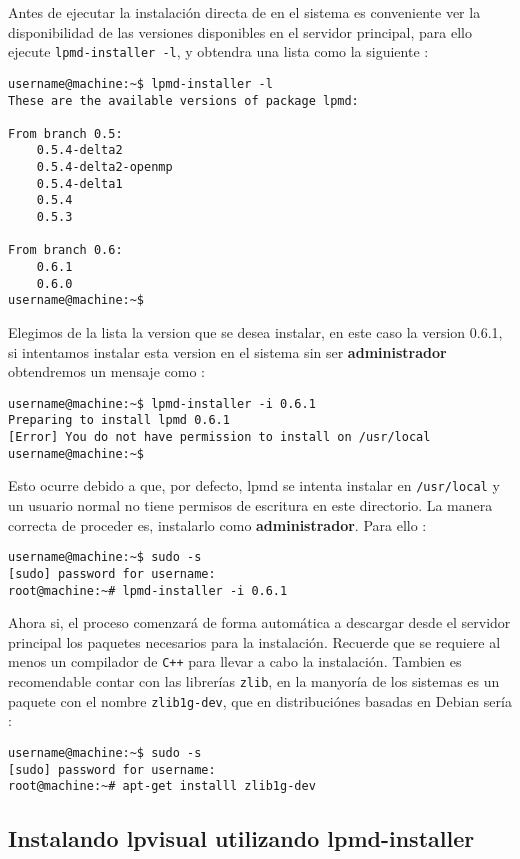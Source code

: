 Antes de ejecutar la instalaci\'on directa de {\lpmd} en el sistema es conveniente ver la disponibilidad de las versiones disponibles en el servidor principal, para ello ejecute \verb|lpmd-installer -l|, y obtendra una lista como la siguiente :

\begin{verbatim}
username@machine:~$ lpmd-installer -l
These are the available versions of package lpmd:

From branch 0.5: 
    0.5.4-delta2
    0.5.4-delta2-openmp
    0.5.4-delta1
    0.5.4
    0.5.3

From branch 0.6: 
    0.6.1
    0.6.0
username@machine:~$
\end{verbatim}

Elegimos de la lista la version que se desea instalar, en este caso la version 0.6.1, si intentamos instalar esta version en el sistema sin ser \textbf{administrador} obtendremos un mensaje como  :

\begin{verbatim}
username@machine:~$ lpmd-installer -i 0.6.1
Preparing to install lpmd 0.6.1
[Error] You do not have permission to install on /usr/local
username@machine:~$
\end{verbatim}

Esto ocurre debido a que, por defecto, lpmd se intenta instalar en \verb|/usr/local| y un usuario normal no tiene permisos de escritura en este directorio. La manera correcta de proceder es, instalarlo como \textbf{administrador}. Para ello :

\begin{verbatim}
username@machine:~$ sudo -s
[sudo] password for username: 
root@machine:~# lpmd-installer -i 0.6.1
\end{verbatim}

Ahora si, el proceso comenzar\'a de forma autom\'atica a descargar desde el servidor principal los paquetes necesarios para la instalaci\'on. Recuerde que se requiere al menos un compilador de \verb|C++| para llevar a cabo la instalaci\'on. Tambien es recomendable contar con las librer\'ias \verb|zlib|, en la manyor\'ia de los sistemas es un paquete con el nombre \verb|zlib1g-dev|, que en distribuci\'ones basadas en Debian ser\'ia :

\begin{verbatim}
username@machine:~$ sudo -s
[sudo] password for username: 
root@machine:~# apt-get installl zlib1g-dev
\end{verbatim}


\subsection{Instalando lpvisual utilizando lpmd-installer}

